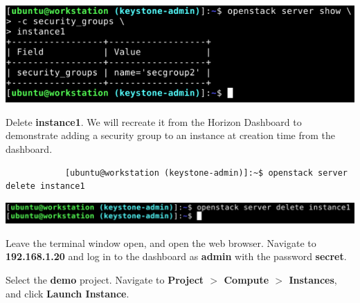 \documentclass[letterpaper, 12pt]{article}
\begin{document}
\begin{enumerate}
\begin{labstep}
        \begin{center}
            \includegraphics[width=\linewidth]{images/part6/step7.png}
        \end{center}
    \end{labstep}

    \begin{labstep}
        Delete \textbf{instance1}.
        We will recreate it from the Horizon Dashboard to demonstrate adding a security group to an instance at creation time from the dashboard.
        \begin{lstlisting}
            [ubuntu@workstation (keystone-admin)]:~$ openstack server delete instance1
        \end{lstlisting}

        \begin{center}
            \includegraphics[width=\linewidth]{images/part6/step8.png}
        \end{center}
    \end{labstep}

    \begin{labstep}
        Leave the terminal window open, and open the web browser.
        Navigate to \textbf{192.168.1.20} and log in to the dashboard as \textbf{admin} with the password \textbf{secret}.
    \end{labstep}

    \begin{labstep}
        Select the \textbf{demo} project.
        Navigate to \textbf{Project $>$ Compute $>$ Instances}, and click \textbf{Launch Instance}.


\end{labstep}
\end{enumerate}
\end{document}
